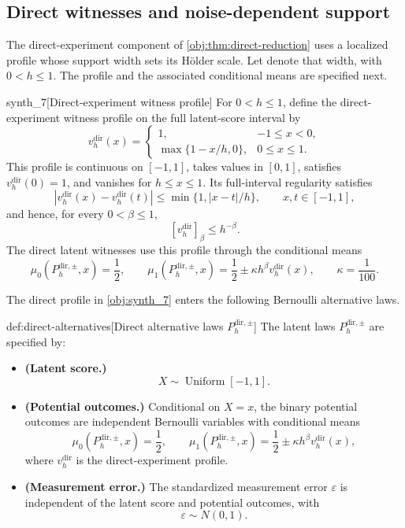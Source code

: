 \subsection{Direct witnesses and noise-dependent support}

The direct-experiment component of \cref{obj:thm:direct-reduction} uses a localized profile whose support width sets its Hölder scale. Let  denote that width, with \(0<h\le1\). The profile and the associated conditional means are specified next.

\begin{definitionv}{synth_7}[Direct-experiment witness profile]
For \(0<h\le1\), define the direct-experiment witness profile on the full latent-score interval by
\[
v_h^{\mathrm{dir}}(x)=
\begin{cases}
1,&-1\le x<0,\\
\max\{1-x/h,0\},&0\le x\le1.
\end{cases}
\]
This profile is continuous on \([-1,1]\), takes values in \([0,1]\), satisfies \(v_h^{\mathrm{dir}}(0)=1\), and vanishes for \(h\le x\le1\). Its full-interval regularity satisfies
\[
|v_h^{\mathrm{dir}}(x)-v_h^{\mathrm{dir}}(t)|
\le\min\{1,|x-t|/h\},
\qquad x,t\in[-1,1],
\]
and hence, for every \(0<\beta\le1\),
\[
[v_h^{\mathrm{dir}}]_\beta\le h^{-\beta}.
\]
The direct latent witnesses use this profile through the conditional means
\[
\mu_0(P_h^{\mathrm{dir},\pm},x)=\frac12,
\qquad
\mu_1(P_h^{\mathrm{dir},\pm},x)
=\frac12\pm\kappa h^\beta v_h^{\mathrm{dir}}(x),
\qquad \kappa=\frac1{100}.
\]
\end{definitionv}

The direct profile  in \cref{obj:synth_7} enters the following Bernoulli alternative laws.

\begin{definitionv}{def:direct-alternatives}[Direct alternative laws \(P_h^{\mathrm{dir},\pm}\)]
The latent laws \(P_h^{\mathrm{dir},\pm}\) are specified by:
\begin{itemize}
\item \textbf{(Latent score.)}
\[
X\sim\operatorname{Uniform}[-1,1].
\]
\item \textbf{(Potential outcomes.)} Conditional on \(X=x\), the binary potential outcomes are independent Bernoulli variables with conditional means
\[
\mu_0(P_h^{\mathrm{dir},\pm},x)=\frac12,
\qquad
\mu_1(P_h^{\mathrm{dir},\pm},x)
=\frac12\pm\kappa h^\beta v_h^{\mathrm{dir}}(x),
\]
where \(v_h^{\mathrm{dir}}\) is the direct-experiment profile.
\item \textbf{(Measurement error.)} The standardized measurement error \(\varepsilon\) is independent of the latent score and potential outcomes, with
\[
\varepsilon\sim N(0,1).
\]
\end{itemize}
\end{definitionv}

